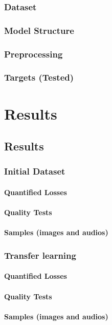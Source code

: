 \documentclass{book}
\begin{document}
\section{Dataset}
\section{Model Structure}
\section{Preprocessing}
\section{Targets (Tested)}


\part{Results}
\chapter{Results}
\section{Initial Dataset}
\subsection{Quantified Losses}
\subsection{Quality Tests}
\subsection{Samples (images and audios)}
\section{Transfer learning}
\subsection{Quantified Losses}
\subsection{Quality Tests}
\subsection{Samples (images and audios)}
\end{document}
